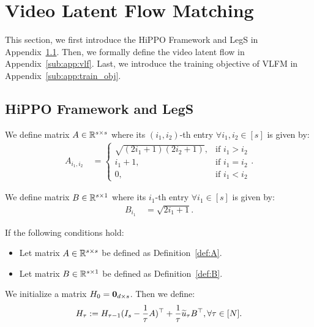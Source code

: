 \section{Video Latent Flow Matching}
\label{sec:app:vlfm}

This section, we first introduce the HiPPO Framework and LegS in Appendix~\ref{sub:app:hippo}. Then, we formally define the video latent flow in Appendix~\ref{sub:app:vlf}. Last, we introduce the training objective of VLFM in Appendix~\ref{sub:app:train_obj}.

\subsection{HiPPO Framework and LegS} \label{sub:app:hippo}

\begin{definition}\label{def:A}
    We define matrix $A \in \mathbb{R}^{s \times s}$ where its $(i_1, i_2)$-th entry $\forall i_1, i_2 \in [s]$ is given by:
    \begin{align*}
        A_{i_1, i_2} & ~ = \begin{cases}
        \sqrt{(2i_1 + 1)(2i_2 + 1)}, & \text{if $i_1 > i_2$} \\
        i_1 + 1, & \text{if $i_1 = i_2$} \\
        0, & \text{if $i_1 < i_2$}
    \end{cases}.
    \end{align*}
\end{definition}

\begin{definition}\label{def:B}
    We define matrix $B \in \mathbb{R}^{s \times 1}$ where its $i_1$-th entry $\forall i_1 \in [s]$ is given by:
    \begin{align*}
        B_{i_1} & ~ = \sqrt{2i_1 + 1}.
    \end{align*}
\end{definition}

\begin{definition}\label{def:H}
    If the following conditions hold:
    \begin{itemize}
        \item Let matrix $A \in \mathbb{R}^{s \times s}$ be defined as Definition~\ref{def:A}.
        \item Let matrix $B \in \mathbb{R}^{s \times 1}$ be defined as Definition~\ref{def:B}.
    \end{itemize}
    We initialize a matrix $H_0 = {\bf 0}_{d \times s}$. Then we define:
    \begin{align*}
        H_{\tau} := H_{\tau-1}( I_s - \frac{1}{\tau} A )^\top + \frac{1}{\tau} \widetilde{u}_\tau B^\top, \forall \tau \in [N].
    \end{align*}
\end{definition}

